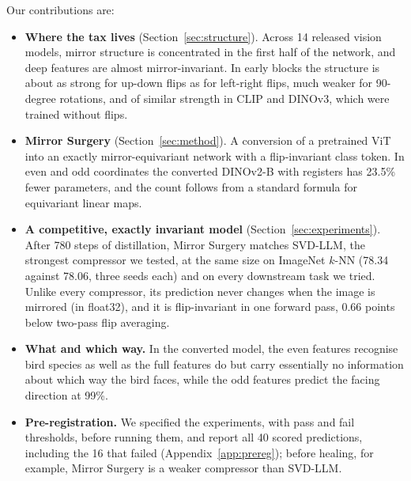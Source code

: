 Our contributions are:
\begin{itemize}
  \item \textbf{Where the tax lives} (Section~\ref{sec:structure}). Across 14 released vision models, mirror structure
  is concentrated in the first half of the network, and deep features are almost mirror-invariant. In early blocks the
  structure is about as strong for up-down flips as for left-right flips, much weaker for 90-degree rotations, and of
  similar strength in CLIP and DINOv3, which were trained without flips.
  \item \textbf{Mirror Surgery} (Section~\ref{sec:method}). A conversion of a pretrained ViT into an exactly
  mirror-equivariant network with a flip-invariant class token. In even and odd coordinates the converted DINOv2-B
  with registers has 23.5\% fewer parameters, and the count follows from a standard formula for equivariant linear
  maps.
  \item \textbf{A competitive, exactly invariant model} (Section~\ref{sec:experiments}). After 780 steps of
  distillation, Mirror Surgery matches SVD-LLM, the strongest compressor we tested, at the same size on ImageNet
  $k$-NN (78.34 against 78.06, three seeds each) and on every downstream task we tried. Unlike every compressor, its
  prediction never changes when the image is mirrored (in float32), and it is flip-invariant in one forward pass, 0.66
  points below two-pass flip averaging.
  \item \textbf{What and which way.} In the converted model, the even features recognise bird species as well as the
  full features do but carry essentially no information about which way the bird faces, while the odd features
  predict the facing direction at 99\%.
  \item \textbf{Pre-registration.} We specified the experiments, with pass and fail thresholds, before running them,
  and report all 40 scored predictions, including the 16 that failed (Appendix~\ref{app:prereg}); before healing, for
  example, Mirror Surgery is a weaker compressor than SVD-LLM.
\end{itemize}
